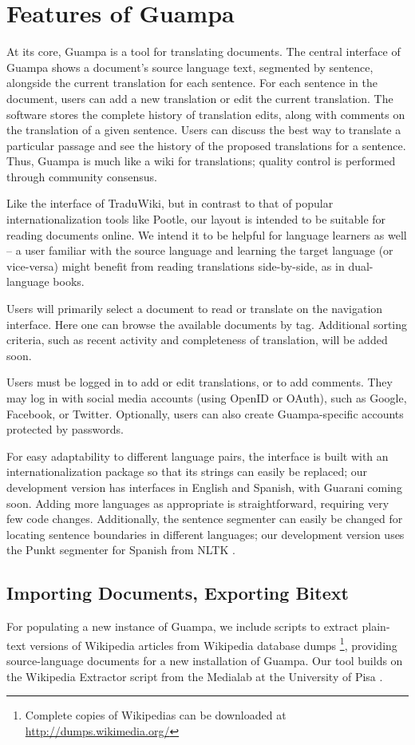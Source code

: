\documentclass[10pt, a4paper]{article}
\begin{document}
\section{Features of Guampa}
At its core, Guampa is a tool for translating documents. The central interface of
Guampa shows a document's source language text, segmented by sentence,
alongside the current translation for each sentence. For each sentence in the
document, users can add a new translation or edit the current translation. The
software stores the complete history of translation edits, along with comments
on the translation of a given sentence. Users can discuss the
best way to translate a particular passage and see the history of the proposed
translations for a sentence. Thus, Guampa is much like a wiki for translations;
quality control is performed through community consensus.


Like the interface of TraduWiki, but in contrast to that of popular
internationalization tools like Pootle, our layout is intended to be suitable
for reading documents online. We intend it to be helpful for language learners
as well -- a user familiar with the source language and learning the target
language (or vice-versa) might benefit from reading translations side-by-side,
as in dual-language books.

Users will primarily select a document to read or translate on the navigation
interface. Here one can browse the available documents by tag. Additional
sorting criteria, such as recent activity and completeness of translation, will
be added soon.

Users must be logged in to add or edit translations, or to add comments. They
may log in with social media accounts (using OpenID or OAuth), such as Google,
Facebook, or Twitter. Optionally, users can also create Guampa-specific
accounts protected by passwords.

For easy adaptability to different language pairs, the interface is built with
an internationalization package so that its strings can easily be replaced; our
development version has interfaces in English and Spanish, with Guarani coming
soon. Adding more languages as appropriate is straightforward, requiring very
few code changes. Additionally, the sentence segmenter can easily be changed
for locating sentence boundaries in different languages; our development
version uses the Punkt segmenter for Spanish from NLTK \cite{nltkbook}.


\subsection{Importing Documents, Exporting Bitext}
For populating a new instance of Guampa, we include scripts to extract
plain-text versions of Wikipedia articles from Wikipedia database dumps
\footnote{Complete copies of Wikipedias can be downloaded at \\
\url{http://dumps.wikimedia.org/}}, providing source-language documents for a
new installation of Guampa. Our tool builds on the Wikipedia Extractor
script from the Medialab at the University of Pisa \cite{pisa-wp-extractor}.
\end{document}
